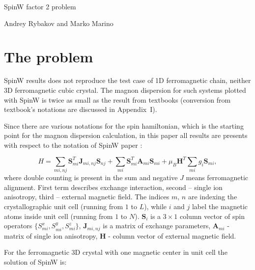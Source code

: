 \documentclass[a4paper,12pt]{article}
\begin{document}
    \begin{center}
    \centering \LARGE SpinW factor 2 problem

    \vspace{1cm}
    \small Andrey Rybakov and Marko Marino
    \end{center}

    \section{The problem}

        SpinW \cite{SpinW} results does not reproduce the test case of 1D ferromagnetic chain, neither 3D ferromagnetic cubic crystal. 
        The magnon dispersion for such systems plotted with SpinW is twice as small as the result from textbooks 
        \cite{rezende2020fundamentals, blundell2003magnetism, gurevich1996magnetization, simon2013oxford, coey2010magnetism, jensen1991rare, white1983quantum} (conversion from textbook's notations are discussed in Appendix~I). 

        Since there are various notations for the spin hamiltonian, which is the starting point for the magnon dispersion calculation, 
        in this paper all results are presents with respect to the notation of SpinW paper \cite{toth2015linear}:

        \begin{equation}
            H = \sum_{mi,nj}\boldsymbol{S}^T_{mi}\boldsymbol{J}_{mi, nj}\boldsymbol{S}_{nj} + 
            \sum_{mi}\boldsymbol{S}^T_{mi}\boldsymbol{A}_{mi}\boldsymbol{S}_{mi} + 
            \mu_B\boldsymbol{H}^T\sum_{mi}g_i\boldsymbol{S}_{mi},
        \end{equation}
        where double counting is present in the sum and negative $J$ means ferromagnetic alignment. 
        First term describes exchange interaction, second -- single ion anisotropy, third -- external magnetic field.
        The indices $m$, $n$ are indexing the crystallographic unit cell (running from $1$ to $L$), while $i$ and $j$ label the magnetic atoms inside unit cell (running from $1$ to $N$).
        $\boldsymbol{S}_i$ is a $3 \times 1$ column vector of spin operators $\{S_{mi}^x, S_{mi}^y, S_{mi}^z\}$, 
        $\boldsymbol{J}_{mi, nj}$ is a matrix of exchange parameters, $\boldsymbol{A}_{mi}$ - matrix of single ion anisotropy,  
        $\boldsymbol{H}$ - column vector of external magnetic field. 

        For the ferromagnetic 3D crystal with one magnetic center in unit cell the solution of SpinW is:
\end{document}
